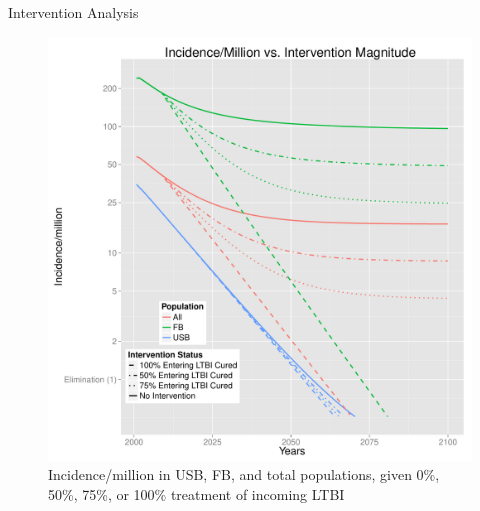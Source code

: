 \documentclass[final]{beamer}
\begin{document}
\begin{frame}
\begin{columns}[T]
\begin{column}{.3\textwidth}
      \begin{block}{Intervention Analysis}
        \begin{figure}[h]
          \begin{minipage}[c]{0.6\textwidth}
            \includegraphics[height=.5\textwidth,width=\textwidth]{redEnLTBIIncGrouped}
          \end{minipage}
          \hspace{0.5em}
          \begin{minipage}[c]{0.35\textwidth}
            \caption{Incidence/million in USB, FB, and total populations,
                     given 0\%, 50\%, 75\%, or 100\% treatment of incoming
                     LTBI}
          \end{minipage}
          \label{fig:redEnLTBI_incidence}
        \end{figure}
        \begin{figure}[h]
          \begin{minipage}[c]{0.6\textwidth}

\end{minipage}
\end{figure}
\end{block}
\end{column}
\end{columns}
\end{frame}
\end{document}

